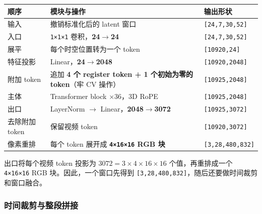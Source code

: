 \documentclass[
  11pt,
  a4paper,
  fontset=none]{ctexart}
\newcounter{none} %
\begin{document}
{\def\LTcaptype{none} %
\begin{longtable}[]{@{}
  >{\raggedright\arraybackslash}p{}
  >{\raggedright\arraybackslash}p{}
  >{\raggedright\arraybackslash}p{}@{}}
\toprule\noalign{}
\begin{minipage}[b]{\linewidth}\raggedright
顺序
\end{minipage} & \begin{minipage}[b]{\linewidth}\raggedright
模块与操作
\end{minipage} & \begin{minipage}[b]{\linewidth}\raggedright
输出形状
\end{minipage} \\
\midrule\noalign{}
\endhead
\bottomrule\noalign{}
\endlastfoot
输入 & 撤销标准化后的 latent 窗口 & \texttt{{[}24,7,30,52{]}} \\
入口 & \texttt{1×1×1} 卷积，\textbf{24\(\rightarrow\)24} &
\texttt{{[}24,7,30,52{]}} \\
展平 & 每个时空位置转为一个 token & \texttt{{[}10920,24{]}} \\
特征投影 & Linear，\textbf{24\(\rightarrow\)2048} &
\texttt{{[}10920,2048{]}} \\
附加 token & 追加 \textbf{4 个 register token + 1 个初始为零的
token}（牢 CV 操作） & \texttt{{[}10925,2048{]}} \\
主体 & Transformer block ×36，3D RoPE & \texttt{{[}10925,2048{]}} \\
出口 & LayerNorm \(\rightarrow\)
Linear，\textbf{2048\(\rightarrow\)3072} & \texttt{{[}10925,3072{]}} \\
去除附加 token & 保留视频 token & \texttt{{[}10920,3072{]}} \\
像素重排 & 每个 token 展开成 \textbf{\texttt{4×16×16} RGB 块} &
\texttt{{[}3,28,480,832{]}} \\
\end{longtable}
}

\endgroup

出口将每个视频 token 投影为 \textbf{\(3072=3\times4\times16\times16\)}
个值，再重排成一个 \texttt{4×16×16} RGB 块。因此，一个窗口先得到
\texttt{{[}3,28,480,832{]}}，随后还要做时间裁剪和窗口融合。


\subsubsection{时间裁剪与整段拼接}\label{h3-time-stitch}
\end{document}
